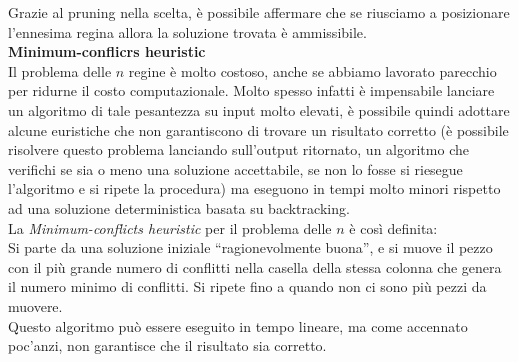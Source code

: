 \documentclass[../cheatSheetAlgoritmi.tex]{subfiles}
\begin{document}
Grazie al pruning nella scelta, è possibile affermare che se riusciamo a posizionare l'ennesima regina allora la soluzione trovata è ammissibile. \\
\textbf{Minimum-conflicrs heuristic} \\
Il problema delle $n$ regine è molto costoso, anche se abbiamo lavorato parecchio per ridurne il costo computazionale. Molto spesso infatti è impensabile lanciare un algoritmo di tale pesantezza su input molto elevati, è possibile quindi adottare alcune euristiche che non garantiscono di trovare un risultato corretto (è possibile risolvere questo problema lanciando sull'output ritornato, un algoritmo che verifichi se sia o meno una soluzione accettabile, se non lo fosse si riesegue l'algoritmo e si ripete la procedura) ma eseguono in tempi molto minori rispetto ad una soluzione deterministica basata su backtracking. \\
La \emph{Minimum-conflicts heuristic} per il problema delle $n$ è così definita: \\
Si parte da una soluzione iniziale “ragionevolmente buona”, e si muove il pezzo con il più grande numero di conflitti nella casella della stessa colonna che genera il numero minimo di conflitti. Si ripete fino a quando non ci sono più pezzi da muovere. \\
Questo algoritmo può essere eseguito in tempo lineare, ma come accennato poc'anzi, non garantisce che il risultato sia corretto.
\newpage
\end{document}
